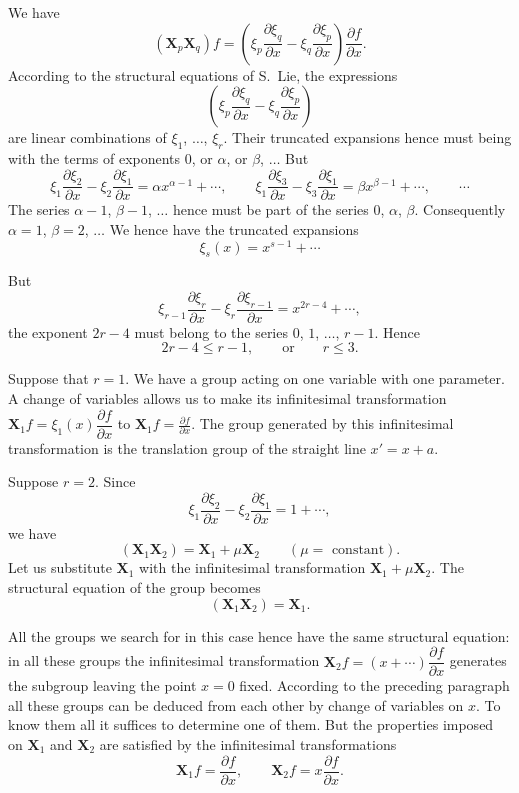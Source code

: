 \documentclass[leqno,11pt]{book}
\numberwithin{equation}{chapter}
\newcommand{\pd}{\partial}
\theoremstyle{shape1}
\theoremstyle{shapesmall}
\begin{document}
We have
\[
(\mathbf{X}_{p}\mathbf{X}_{q})f=\left(\xi_{p}\frac{\pd \xi_{q}}{\pd x}-\xi_{q}\frac{\pd\xi_{p}}{\pd x}\right)\frac{\pd f}{\pd x}.
\]
According to the structural equations of S.~Lie, the expressions
\[
\left(\xi_{p}\frac{\pd\xi_{q}}{\pd x}-\xi_{q}\frac{\pd \xi_{p}}{\pd x}\right)
\]
are linear combinations of $\xi_{1}$, $\dots$, $\xi_{r}$. Their truncated expansions hence must being with the terms of exponents $0$, or $\alpha$, or $\beta$, $\dots$ But
\[
\xi_{1}\frac{\pd\xi_{2}}{\pd x}-\xi_{2}\frac{\pd \xi_{1}}{\pd x}=\alpha x^{\alpha-1}+\cdots,\qquad\xi_{1}\frac{\pd \xi_{3}}{\pd x}-\xi_{3}\frac{\pd\xi_{1}}{\pd x}=\beta x^{\beta-1}+\cdots,\qquad\cdots
\]
The series $\alpha-1$, $\beta-1$, $\dots$ hence must be part of the series $0$, $\alpha$, $\beta$. Consequently $\alpha=1$, $\beta=2$, $\dots$ We hence have the truncated expansions
\[
\xi_{s}(x)=x^{s-1}+\cdots
\]

But
\[
\xi_{r-1}\frac{\pd\xi_{r}}{\pd x}-\xi_{r}\frac{\pd \xi_{r-1}}{\pd x}=x^{2r-4}+\cdots,
\]
the exponent $2r-4$ must belong to the series $0$, $1$, $\dots$, $r-1$. Hence
\[
2r-4\le r-1,\qquad\text{or}\qquad r\le 3.
\]

Suppose that $r=1$. We have a group acting on one variable with one parameter. A change of variables allows us to make its infinitesimal transformation $\mathbf{X}_{1}f=\xi_{1}(x)\dfrac{\pd f}{\pd x}$ to $\mathbf{X}_{1}f=\frac{\pd f}{\pd x}$. The group generated by this infinitesimal transformation is the translation group of the straight line $x'=x+a$.

Suppose $r=2$. Since
\[
\xi_{1}\frac{\pd\xi_{2}}{\pd x}-\xi_{2}\frac{\pd\xi_{1}}{\pd x}=1+\cdots,
\]
we have
\[
(\mathbf{X}_{1}\mathbf{X}_{2})=\mathbf{X}_{1}+\mu\mathbf{X}_{2}\qquad (\mu=\text{ constant}).
\]
Let us substitute $\mathbf{X}_{1}$ with the infinitesimal transformation $\mathbf{X}_{1}+\mu\mathbf{X}_{2}$. The structural equation of the group becomes
\[
(\mathbf{X}_{1}\mathbf{X}_{2})=\mathbf{X}_{1}.
\]

All the groups we search for in this case hence have the same structural equation: in all these groups the infinitesimal transformation $\mathbf{X}_{2}f=(x+\cdots)\dfrac{\pd f}{\pd x}$ generates the subgroup leaving the point $x=0$ fixed. According to the preceding paragraph all these groups can be deduced from each other by change of variables on $x$. To know them all it suffices to determine one of them. But the properties imposed on $\mathbf{X}_{1}$ and $\mathbf{X}_{2}$ are satisfied by the infinitesimal transformations 
\[
\mathbf{X}_{1}f=\frac{\pd f}{\pd x},\qquad\mathbf{X}_{2}f=x\frac{\pd f}{\pd x}.
\]
\end{document}
